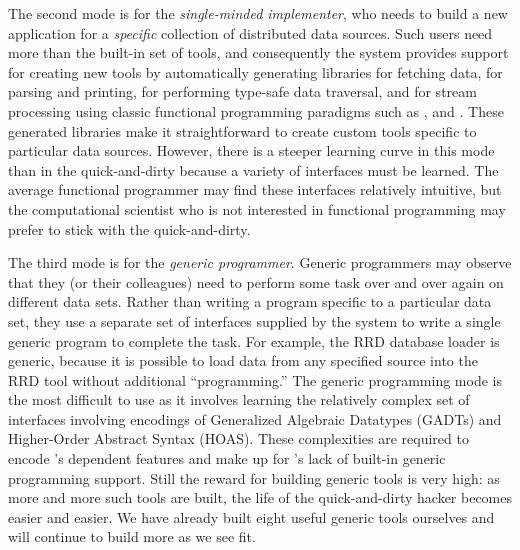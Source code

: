 The second mode is
for the {\em single-minded implementer}, who needs to build a new
application for a {\em specific} collection of distributed data
sources.  Such users need more than the built-in set of tools, 
and consequently the system provides support for
creating new tools by automatically generating libraries for fetching
data, for parsing and printing, for performing type-safe data
traversal, and for stream processing using classic functional
programming paradigms such as ,  and .
These generated libraries make it straightforward to create custom tools
specific to particular data sources.  However, there is a steeper learning
curve in this mode than in the quick-and-dirty because a variety of
interfaces must be learned.  The average functional programmer may find
these interfaces relatively intuitive, but the computational scientist
who is not interested in functional programming may prefer to stick with
the quick-and-dirty. 

The third mode is for the {\em generic programmer}.  Generic
programmers may observe that they (or their colleagues) 
need to perform some task over and over again on different
data sets.  Rather than writing a program specific to a particular
data set, they use a 
separate set of interfaces supplied by the \padsd{} system to write a
single generic program to complete the task.  For example, the RRD database
loader is generic, because it is possible to load data from any
specified source into the RRD tool without additional ``programming.''
The generic programming mode is the most difficult to use as it involves
learning the relatively complex set of interfaces involving encodings
of Generalized Algebraic Datatypes (GADTs) and Higher-Order Abstract Syntax 
(HOAS).  These complexities are required to encode \padsd{}'s dependent features and make up for \ocaml{}'s lack of built-in generic programming support.
Still the reward for building generic tools is very high:
as more and more such tools are built, the life of the quick-and-dirty
hacker becomes easier and easier.  We have already built eight useful
generic tools ourselves and will continue to build more as we see fit.



